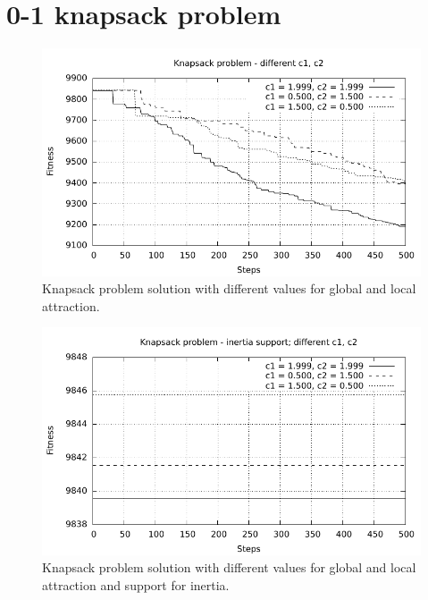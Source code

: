 \section{0-1 knapsack problem}

\begin{figure}[!h]
	\centering
		\includegraphics[width=15cm]{img/3b.pdf}
	\caption{Knapsack problem solution with different values for global and local attraction.}
	\label{fig:knaspack}
\end{figure}

\begin{figure}[!h]
	\centering
		\includegraphics[width=15cm]{img/3c.pdf}
	\caption{Knapsack problem solution with different values for global and local attraction and support for inertia.}
	\label{fig:knaspack_inertia}
\end{figure}